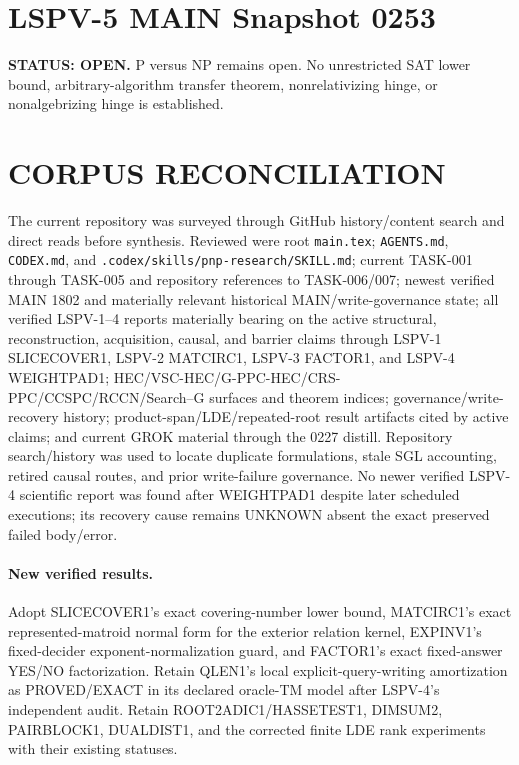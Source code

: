 \documentclass[11pt]{article}
\begin{document}
\section*{LSPV-5 MAIN Snapshot 0253}
\textbf{STATUS: OPEN.} P versus NP remains open. No unrestricted SAT lower bound, arbitrary-algorithm transfer theorem, nonrelativizing hinge, or nonalgebrizing hinge is established.

\section*{CORPUS RECONCILIATION}
The current repository was surveyed through GitHub history/content search and direct reads before synthesis. Reviewed were root \texttt{main.tex}; \texttt{AGENTS.md}, \texttt{CODEX.md}, and \texttt{.codex/skills/pnp-research/SKILL.md}; current TASK-001 through TASK-005 and repository references to TASK-006/007; newest verified MAIN 1802 and materially relevant historical MAIN/write-governance state; all verified LSPV-1--4 reports materially bearing on the active structural, reconstruction, acquisition, causal, and barrier claims through LSPV-1 SLICECOVER1, LSPV-2 MATCIRC1, LSPV-3 FACTOR1, and LSPV-4 WEIGHTPAD1; HEC/VSC-HEC/G-PPC-HEC/CRS-PPC/CCSPC/RCCN/Search--G surfaces and theorem indices; governance/write-recovery history; product-span/LDE/repeated-root result artifacts cited by active claims; and current GROK material through the 0227 distill. Repository search/history was used to locate duplicate formulations, stale SGL accounting, retired causal routes, and prior write-failure governance. No newer verified LSPV-4 scientific report was found after WEIGHTPAD1 despite later scheduled executions; its recovery cause remains UNKNOWN absent the exact preserved failed body/error.

\paragraph{New verified results.}
Adopt SLICECOVER1's exact covering-number lower bound, MATCIRC1's exact represented-matroid normal form for the exterior relation kernel, EXPINV1's fixed-decider exponent-normalization guard, and FACTOR1's exact fixed-answer YES/NO factorization. Retain QLEN1's local explicit-query-writing amortization as PROVED/EXACT in its declared oracle-TM model after LSPV-4's independent audit. Retain ROOT2ADIC1/HASSETEST1, DIMSUM2, PAIRBLOCK1, DUALDIST1, and the corrected finite LDE rank experiments with their existing statuses.
\end{document}
